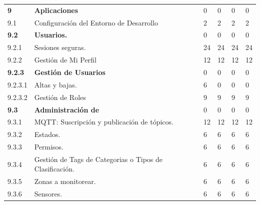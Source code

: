 \documentclass[11pt]{charter}
\begin{document}
\begin{tabularx}{\linewidth}{@{}|p{2cm}|p{11cm}|p{2.5cm}|p{2.5cm}|p{2.5cm}|p{2.5cm}|@{}}
\textbf{9}     & \textbf{Aplicaciones}                                                                         & 0    & 0    & 0    & 0    \\
9.1            & Configuración del Entorno de   Desarrollo                                                     & 2    & 2    & 2    & 2    \\
\textbf{9.2}   & \textbf{Usuarios.}                                                                            & 0    & 0    & 0    & 0    \\
9.2.1          & Sesiones seguras.                                                                             & 24   & 24   & 24   & 24   \\
9.2.2          & Gestión de Mi Perfil                                                                          & 12   & 12   & 12   & 12   \\
\textbf{9.2.3} & \textbf{Gestión de Usuarios}                                                                  & 0    & 0    & 0    & 0    \\
9.2.3.1        & Altas y bajas.                                                                                & 6    & 0    & 0    & 0    \\
9.2.3.2        & Gestión de Roles                                                                              & 9    & 9    & 9    & 9    \\
\textbf{9.3}   & \textbf{Administración de}                                                                    & 0    & 0    & 0    & 0    \\
9.3.1          & MQTT: Suscripción y publicación   de tópicos.                                                 & 12   & 12   & 12   & 12   \\
9.3.2          & Estados.                                                                                      & 6    & 6    & 6    & 6    \\
9.3.3          & Permisos.                                                                                     & 6    & 6    & 6    & 6    \\
9.3.4          & Gestión de Tags de Categorias o   Tipos de Clasificación.                                     & 6    & 6    & 6    & 6    \\
9.3.5          & Zonas a monitorear.                                                                           & 6    & 6    & 6    & 6    \\
9.3.6          & Sensores.                                                                                     & 6    & 6    & 6    & 6    \\

\end{tabularx}
\end{document}
